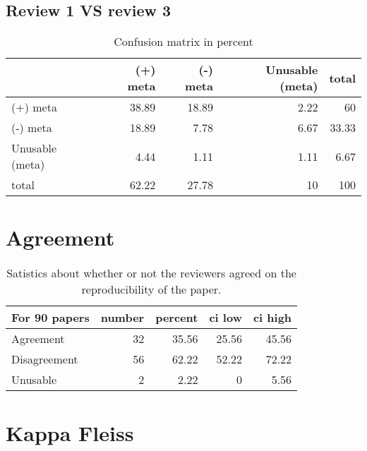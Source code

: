 \documentclass{article}
\begin{document}
\subsection{Review 1 VS review 3} 

\begin{table}[H]

\centering

\begin{tabular}{lrrrr}
\hline
                 &   (+) meta &   (-) meta &   Unusable (meta) &   total \\
\hline
 (+) meta        &      38.89 &      18.89 &              2.22 &   60    \\
 (-) meta        &      18.89 &       7.78 &              6.67 &   33.33 \\
 Unusable (meta) &       4.44 &       1.11 &              1.11 &    6.67 \\
 total           &      62.22 &      27.78 &             10    &  100    \\
\hline
\end{tabular}\caption{Confusion matrix in percent}

\end{table}



\section{Agreement} 

\begin{table}[H]

\centering

\begin{tabular}{lrrrr}
\hline
 For 90 papers   &   number &   percent &   ci low &   ci high \\
\hline
 Agreement       &       32 &     35.56 &    25.56 &     45.56 \\
 Disagreement    &       56 &     62.22 &    52.22 &     72.22 \\
 Unusable        &        2 &      2.22 &     0    &      5.56 \\
\hline
\end{tabular}\caption{Satistics about whether or not the reviewers agreed on the reproducibility of the paper.}

\end{table}



\section{Kappa Fleiss} 
\end{document}
